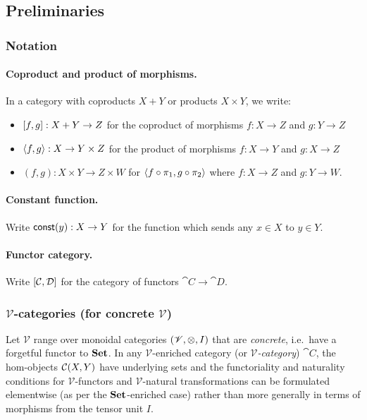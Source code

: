 \subsection{Preliminaries}

\subsubsection{Notation}

\paragraph{Coproduct and product of morphisms.} In a category with coproducts $X + Y$ or products $X \times
Y$, we write:
\begin{itemize}
\item $[f, g]: X + Y \to Z$ for the coproduct of morphisms $f: X \to Z$ and $g: Y \to Z$
\item $\langle f, g\rangle: X \to Y \times Z$ for the product of morphisms $f: X \to Y$ and $g: X \to Z$
\item $(f,g): X \times Y \to Z \times W$ for $\langle f \circ \pi_1, g \circ \pi_2\rangle$ where $f: X \to Z$ and $g: Y \to W$.
\end{itemize}

\paragraph{Constant function.} Write $\mathsf{const}(y): X \to Y$ for the function which sends any $x \in X$ to $y \in
Y$.

\paragraph{Functor category.} Write $[\mathcal{C},\mathcal{D}]$ for the category of functors $\cat{C} \to
\cat{D}$.

\subsubsection{$\mathscr{V}$-categories (for concrete $\mathscr{V}$)}

Let $\mathscr{V}$ range over monoidal categories $(\mathscr{V}, \otimes, I)$ that are \emph{concrete},
i.e.~have a forgetful functor to $\mathbf{Set}$. In any $\mathscr{V}$-enriched category (or
\emph{$\mathscr{V}$-category}) $\cat{C}$, the hom-objects ${\mathcal{C}}(X,Y)$ have underlying sets and the
functoriality and naturality conditions for $\mathscr{V}$-functors and $\mathscr{V}$-natural transformations
can be formulated elementwise (as per the $\mathbf{Set}$-enriched case) rather than more generally in terms of
morphisms from the tensor unit $I$. 

